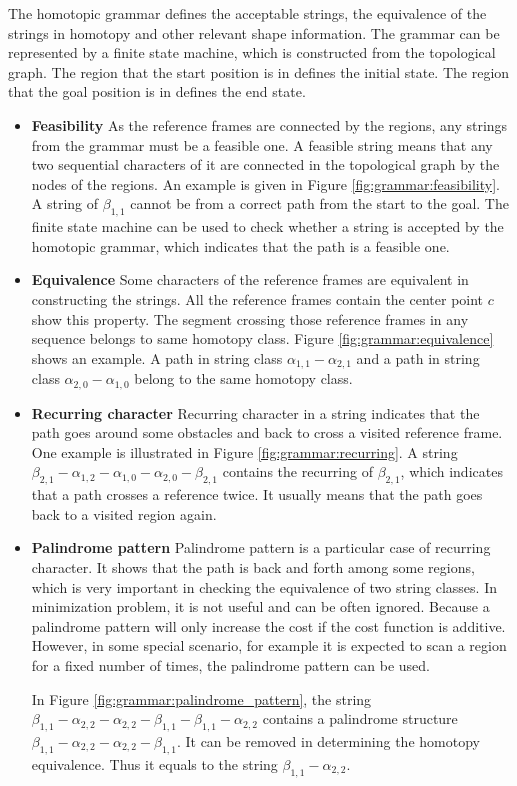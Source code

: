 \documentclass[letterpaper, 10 pt, conference]{ieeeconf}
\begin{document}
The homotopic grammar defines the acceptable strings, the equivalence of the strings in homotopy and other relevant shape information.
The grammar can be represented by a finite state machine, which is constructed from the topological graph.
The region that the start position is in defines the initial state.
The region that the goal position is in defines the end state.
\begin{itemize}
	\item \textbf{Feasibility}
	As the reference frames are connected by the regions, any strings from the grammar must be a feasible one.
	A feasible string means that any two sequential characters of it are connected in the topological graph by the nodes of the regions.
	An example is given in Figure \ref{fig:grammar:feasibility}.
	A string of $ \beta_{1,1} $ cannot be from a correct path from the start to the goal.
	The finite state machine can be used to check whether a string is accepted by the homotopic grammar, which indicates that the path is a feasible one.
	
	\item \textbf{Equivalence}
	Some characters of the reference frames are equivalent in constructing the strings.
	All the reference frames contain the center point $ c $ show this property.
	The segment crossing those reference frames in any sequence belongs to same homotopy class.
	Figure \ref{fig:grammar:equivalence} shows an example.
	A path in string class $ \alpha_{1,1}-\alpha_{2,1} $ and a path in string class $ \alpha_{2,0}-\alpha_{1,0} $ belong to the same homotopy class.
	
	
	\item \textbf{Recurring character}
	Recurring character in a string indicates that the path goes around some obstacles and back to cross a visited reference frame.
	One example is illustrated in Figure \ref{fig:grammar:recurring}.
	A string $ \beta_{2,1}-\alpha_{1,2}-\alpha_{1,0}-\alpha_{2,0}-\beta_{2,1} $ contains the recurring of $ \beta_{2,1} $, which indicates that a path crosses a reference twice.
	It usually means that the path goes back to a visited region again.
	
	\item \textbf{Palindrome pattern}
	Palindrome pattern is a particular case of recurring character.
	It shows that the path is back and forth among some regions,
	which is very important in checking the equivalence of two string classes.
	In minimization problem, it is not useful and can be often ignored.
	Because a palindrome pattern will only increase the cost if the cost function is additive.
	However, in some special scenario, for example it is expected to scan a region for a fixed number of times, the palindrome pattern can be used.
	
	In Figure \ref{fig:grammar:palindrome_pattern}, the string $ \beta_{1,1}-\alpha_{2,2}-\alpha_{2,2}-\beta_{1,1}-\beta_{1,1}-\alpha_{2,2} $ contains a palindrome structure $ \beta_{1,1}-\alpha_{2,2}-\alpha_{2,2}-\beta_{1,1} $.
	It can be removed in determining the homotopy equivalence.
	Thus it equals to the string $ \beta_{1,1}-\alpha_{2,2} $.
	
\end{itemize}
\end{document}
